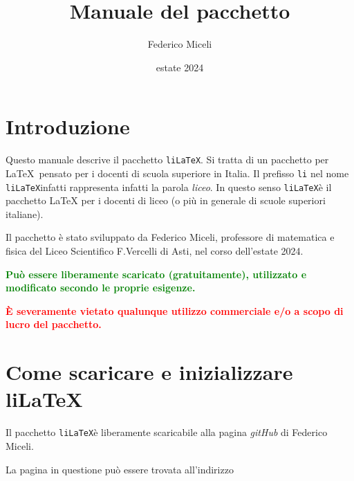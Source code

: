 \documentclass[italian, a4paper]{article}
\title{Manuale del pacchetto \liLaTeX}
\author{Federico Miceli}
\date{estate 2024}
\newcommand{\ttt}[1]{\texttt{#1}}
\newcommand{\liLaTeX}{\ttt{liLaTeX}}
\begin{document}
\maketitle
\tableofcontents

\section{Introduzione}
Questo manuale descrive il pacchetto \liLaTeX. Si tratta di un pacchetto per \LaTeX\ pensato per i docenti di scuola superiore in Italia. Il prefisso \ttt{li} nel nome \liLaTeX infatti rappresenta infatti la parola \textit{liceo}. In questo senso \liLaTeX è il pacchetto LaTeX per i docenti di liceo (o più in generale di scuole superiori italiane).

Il pacchetto è stato sviluppato da Federico Miceli, professore di matematica e fisica del Liceo Scientifico F.Vercelli di Asti, nel corso dell'estate 2024.

\textcolor{Green}{\textbf{Può essere liberamente scaricato (gratuitamente), utilizzato e modificato secondo le proprie esigenze.}}

\textcolor{red}{\textbf{È severamente vietato qualunque utilizzo commerciale e/o a scopo di lucro del pacchetto.}}

\newpage
\section{Come scaricare e inizializzare liLaTeX}\label{installazione}
Il pacchetto \liLaTeX è liberamente scaricabile alla pagina \textit{gitHub} di Federico Miceli.

La pagina in questione può essere trovata all'indirizzo

\begin{center}\end{center}
\end{document}
